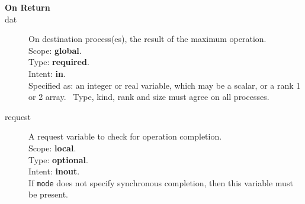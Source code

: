 \begin{description}
\item[\bf On Return]
\item[dat] On destination process(es), the result of the maximum operation.\\
Scope: {\bf global}.\\
Type: {\bf required}.\\
Intent: {\bf in}.\\
Specified as: an integer or  real variable, which may be a
scalar, or a rank 1 or 2 array. \
Type, kind, rank and size must agree on all processes.
\item[request] A request variable to check for operation completion.\\
Scope: {\bf local}.\\
Type: {\bf optional}.\\
Intent: {\bf inout}.\\
If \verb|mode| does not specify synchronous completion, then this
variable must be present.
\end{description}



